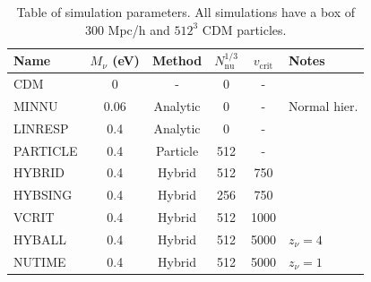 \documentclass[useAMS, usenatbib]{mnras}
\begin{document}
\begin{table}
\begin{center}
\begin{tabular}{|l|c|c|c|c|l|}
\hline
    Name & $M_\nu$ (eV) & Method & $N_\mathrm{nu}^{1/3}$ & $v_\mathrm{crit}$ & Notes \\
\hline
CDM    &       0             &    -          & 0         & - &    \\
MINNU    &     0.06            &   Analytic    & 0         & - &  Normal hier.  \\
LINRESP    &     0.4             &   Analytic    & 0         & - &    \\
PARTICLE    &     0.4             &   Particle    & 512       & - &    \\
HYBRID    &     0.4             &   Hybrid      & 512       & 750 & \\
HYBSING    &     0.4             &   Hybrid      & 256       & 750 & \\
VCRIT    &     0.4             &   Hybrid      & 512       & 1000 & \\
HYBALL    &     0.4             &   Hybrid      & 512       & 5000 & $z_\nu = 4$ \\
NUTIME    &     0.4             &   Hybrid      & 512       & 5000 & $z_\nu = 1$  \\

\hline
\end{tabular}
\end{center}
\caption{Table of simulation parameters. All simulations have a box of $300$ Mpc/h
and $512^3$ CDM particles.
}
\label{tab:simulations}
\end{table}
\end{document}
